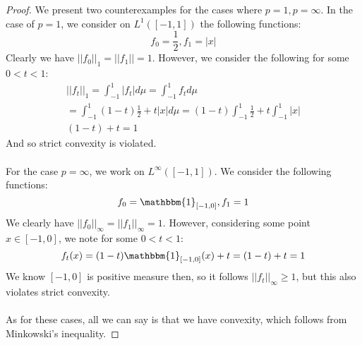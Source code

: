 \documentclass[12pt]{article}
\newenvironment{ex}[2][Exercise]{\begin{trivlist}
\item[\hskip \labelsep {\bfseries #1}\hskip \labelsep {\bfseries #2.}]}{\end{trivlist}}
\begin{document}
\begin{ex}{20}
\begin{enumerate}[label=(\alph*)]
        \begin{proof}
            We present two counterexamples for the cases where $p = 1, p = \infty$. In the case of $p = 1$, we consider on $L^1([-1,1])$ the following functions: $$f_0 = \frac{1}{2}, f_1 = |x|$$
            Clearly we have $||f_0||_1 = ||f_1|| = 1$. However, we consider the following for some $0 < t < 1$:
            \begin{equation}
                \begin{aligned}
                    ||f_t||_1 = \int_{-1}^1 |f_t| d\mu = \int_{-1}^1 f_t d\mu \\
                    = \int_{-1}^1 (1-t)\frac{1}{2} + t|x| d\mu = (1-t)\int_{-1}^1 \frac{1}{2} + t \int_{-1}^1 |x| \\
                    (1 - t) + t = 1
                \end{aligned}
            \end{equation}
            And so strict convexity is violated. \\ \\
            For the case $p = \infty$, we work on $L^\infty([-1,1])$. We consider the following functions:
            \begin{equation}
                f_0 = \mathbbm{1}_{[-1,0]}, f_1 = 1
            \end{equation}
            We clearly have $||f_0||_\infty = ||f_1||_\infty = 1$. However, considering some point $x \in [-1,0]$, we note for some $0 < t < 1$:
            \begin{equation}
                f_t(x) = (1-t)\mathbbm{1}_{[-1,0]}(x) + t = (1 - t) + t = 1
            \end{equation}
            We know $[-1,0]$ is positive measure then, so  it follows $||f_t||_\infty \geq 1$, but this also violates strict convexity. \\ \\
            As for these cases, all we can say is that we have convexity, which follows from Minkowski's inequality.
        \end{proof}
    \end{enumerate}
\end{ex}
\end{document}
